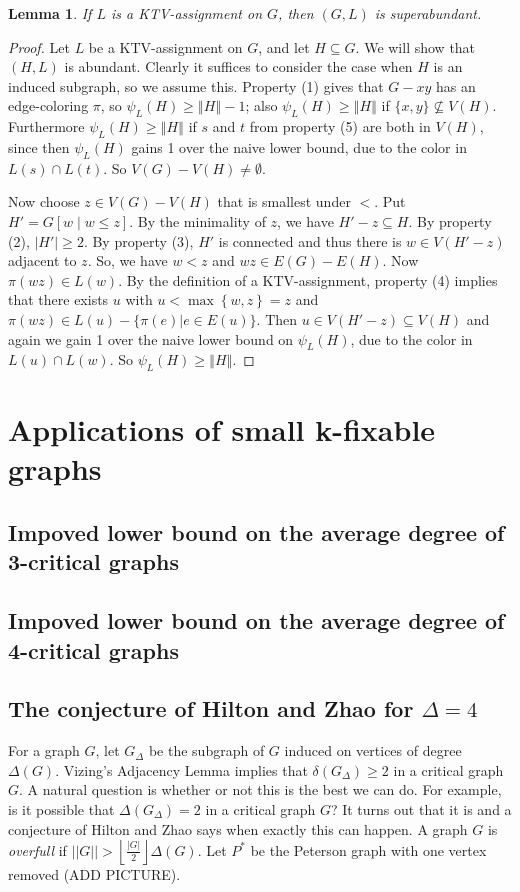 \documentclass[12pt]{article}
\theoremstyle{plain}
\newtheorem{lem}[thm]{Lemma}
\theoremstyle{definition}
\theoremstyle{remark}
\newcommand{\set}[1]{\left\{ #1 \right\}}
\newcommand{\card}[1]{\left|#1\right|}
\newcommand{\size}[1]{\left\Vert#1\right\Vert}
\newcommand{\floor}[1]{\left\lfloor#1\right\rfloor}
\newcommand{\brackets}[1]{\left[ #1 \right]}
\begin{document}
\begin{lem}\label{KTVImpliesSuperabundant}
If $L$ is a KTV-assignment on $G$, then $(G, L)$ is superabundant.
\end{lem}
\begin{proof}
Let $L$ be a KTV-assignment on $G$, and let $H \subseteq G$.  We will show that
$(H,L)$ is abundant.  
Clearly it suffices to consider the case when $H$ is an induced subgraph, so we
assume this.
Property (1) gives that $G-xy$ has an edge-coloring
$\pi$, so $\psi_L(H)\ge \size{H}-1$; also $\psi_L(H)\ge \size{H}$ if
$\{x,y\}\not\subseteq V(H)$.  Furthermore $\psi_L(H)\ge \size{H}$ if $s$ and
$t$ from property (5) are both in $V(H)$, since then $\psi_L(H)$ gains 1 over
the naive lower bound, due to the color in $L(s)\cap L(t)$.  So $V(G)-
V(H)\ne \emptyset$.

Now choose $z \in V(G) - V(H)$ that is smallest under $<$.  
Put $H' = G\brackets{w \mid w \le z}$.  By the minimality of $z$, we have $H' - z \subseteq H$. By property (2), $\card{H'} \ge 2$.  
By property (3), $H'$ is connected and thus there is $w \in V(H' - z)$ adjacent to $z$. So, we have $w < z$ and $wz\in E(G)-E(H)$.
Now $\pi(wz)\in L(w)$.  By the definition of a KTV-assignment, 
property (4) implies that there exists $u$ with $u < \max\set{w, z} = z$ and $\pi(wz) \in
L(u)-\{\pi(e)|e\in E(u)\}$.  Then $u \in V(H' - z) \subseteq V(H)$ and
again we gain 1 over the naive lower bound on $\psi_L(H)$, due to the color
in $L(u)\cap L(w)$.  So $\psi_L(H)\ge \size{H}$.
\end{proof}

\section{Applications of small k-fixable graphs}
\subsection{Impoved lower bound on the average degree of 3-critical graphs}
\subsection{Impoved lower bound on the average degree of 4-critical graphs}
\subsection{The conjecture of Hilton and Zhao for $\Delta=4$}
For a graph $G$, let $G_\Delta$ be the subgraph of $G$ induced on vertices of degree $\Delta(G)$.  Vizing's Adjacency Lemma implies that $\delta(G_\Delta) \ge 2$ in a critical graph $G$.  A natural question is whether or not this is the best we can do.  For example, is it possible that $\Delta(G_\Delta) = 2$ in a critical graph $G$?  It turns out that it is and a conjecture of Hilton and Zhao says when exactly this can happen.  A graph $G$ is \emph{overfull} if $||G|| > \floor{\frac{|G|}{2}}\Delta(G)$.  Let $P^*$ be the Peterson graph with one vertex removed (ADD PICTURE).
\end{document}
